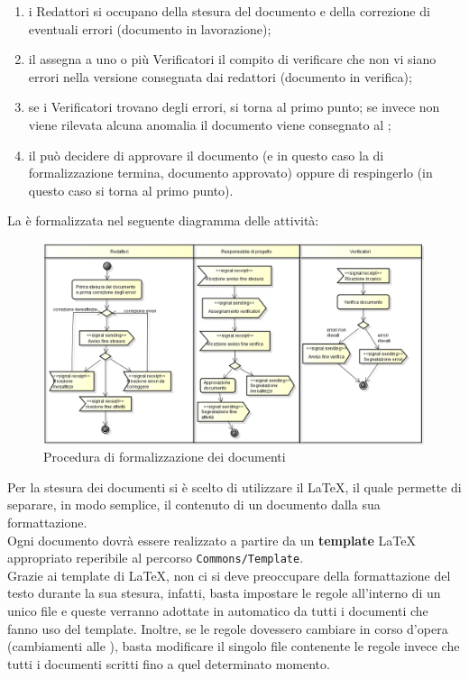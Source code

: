 				\begin{enumerate}
					\item i Redattori si occupano della stesura del documento e della correzione di eventuali errori (documento in lavorazione);
					\item il  assegna a uno o più Verificatori il compito di verificare che non vi siano errori nella versione consegnata dai redattori (documento in verifica);
					\item se i Verificatori trovano degli errori, si torna al primo punto; se invece non viene rilevata alcuna anomalia il documento viene consegnato al ;
					\item il  può decidere di approvare il documento (e in questo caso la  di formalizzazione termina, documento approvato) oppure di respingerlo (in questo caso si torna al primo punto).
				\end{enumerate}
				La  è formalizzata nel seguente diagramma delle attività:
				\begin{figure}[H]
					\centering
					\includegraphics[width=\textwidth]{NormeDiProgetto/Pics/FormalizzazioneDocumenti}
					\caption{Procedura di formalizzazione dei documenti}
				\end{figure}
		Per la stesura dei documenti si è scelto di utilizzare il  \LaTeX{}, il quale permette di separare, in modo semplice, il contenuto di un documento dalla sua formattazione. \\
		Ogni documento  dovrà essere realizzato a partire da un \textbf{template} \LaTeX{} appropriato reperibile al percorso \texttt{Commons/Template}.\\
		Grazie ai template di \LaTeX{}, non ci si deve preoccupare della formattazione del testo durante la sua stesura, infatti, basta impostare le regole all’interno di un unico file e queste verranno adottate in automatico da tutti i documenti che fanno uso del template. Inoltre, se le regole dovessero cambiare in corso d’opera (cambiamenti alle ), basta modificare il singolo file contenente le regole invece che tutti i documenti scritti fino a quel determinato momento. \\
